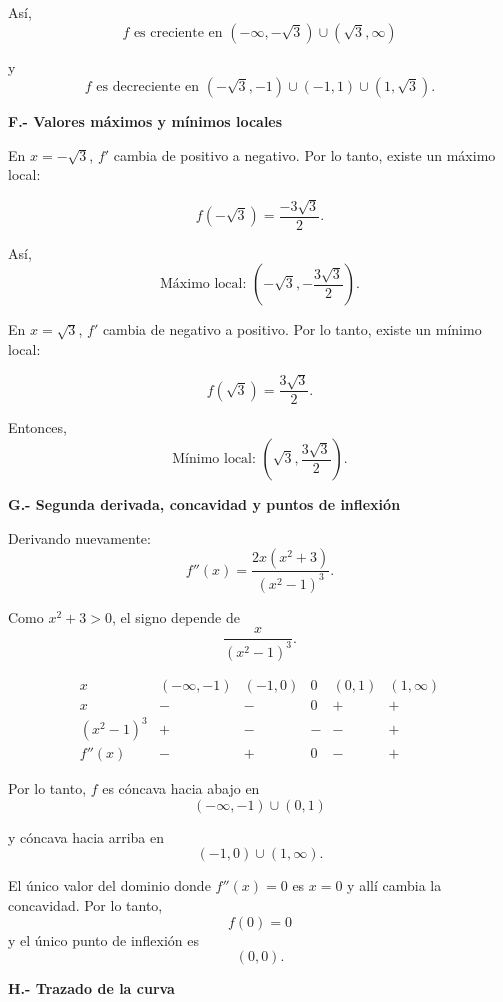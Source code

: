 \documentclass[12pt]{article}
\begin{document}
\begin{enumerate}[label=\alph*.-]
    Así,
    \[
    \boxed{
    f\text{ es creciente en }
    (-\infty,-\sqrt3)\cup(\sqrt3,\infty)
    }
    \]

    y
    \[
    \boxed{
    f\text{ es decreciente en }
    (-\sqrt3,-1)\cup(-1,1)\cup(1,\sqrt3).
    }
    \]

    \textbf{F.- Valores máximos y mínimos locales}

    En $x=-\sqrt3$, $f'$ cambia de positivo a negativo. Por lo tanto,
    existe un máximo local:

    \[
    f(-\sqrt3)
    =
    \frac{-3\sqrt3}{2}.
    \]

    Así,
    \[
    \boxed{
    \text{Máximo local: }
    \left(-\sqrt3,-\frac{3\sqrt3}{2}\right)
    }.
    \]

    En $x=\sqrt3$, $f'$ cambia de negativo a positivo. Por lo tanto,
    existe un mínimo local:

    \[
    f(\sqrt3)
    =
    \frac{3\sqrt3}{2}.
    \]

    Entonces,
    \[
    \boxed{
    \text{Mínimo local: }
    \left(\sqrt3,\frac{3\sqrt3}{2}\right)
    }.
    \]

    \textbf{G.- Segunda derivada, concavidad y puntos de inflexión}

    Derivando nuevamente:
    \[
    f''(x)
    =
    \frac{2x(x^2+3)}{(x^2-1)^3}.
    \]

    Como $x^2+3>0$, el signo depende de
    \[
    \frac{x}{(x^2-1)^3}.
    \]

    \[
    \begin{array}{c|ccccc}
    x & (-\infty,-1) & (-1,0) & 0 & (0,1) & (1,\infty)\\
    \hline
    x & - & - & 0 & + & +\\
    (x^2-1)^3 & + & - & - & - & +\\
    \hline
    f''(x) & - & + & 0 & - & +
    \end{array}
    \]

    Por lo tanto, $f$ es cóncava hacia abajo en
    \[
    \boxed{
    (-\infty,-1)\cup(0,1)
    }
    \]

    y cóncava hacia arriba en
    \[
    \boxed{
    (-1,0)\cup(1,\infty).
    }
    \]

    El único valor del dominio donde $f''(x)=0$ es $x=0$ y allí
    cambia la concavidad. Por lo tanto,
    \[
    f(0)=0
    \]
    y el único punto de inflexión es
    \[
    \boxed{(0,0)}.
    \]

    \textbf{H.- Trazado de la curva}


\end{enumerate}
\end{document}

